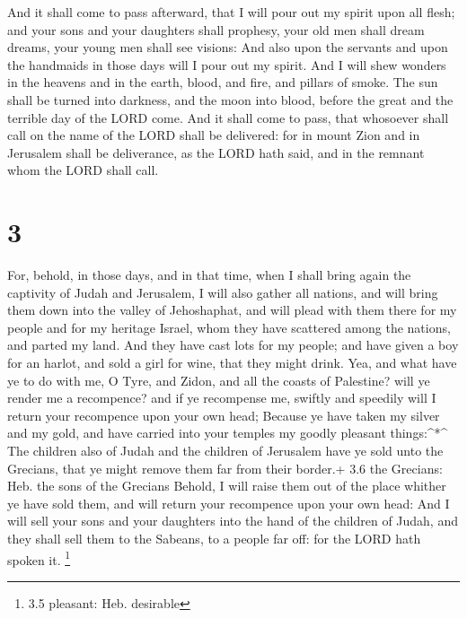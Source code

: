 And it shall come to pass afterward, that I will pour out
my spirit upon all flesh; and your sons and your daughters shall
prophesy, your old men shall dream dreams, your young men shall see
visions:  And also upon the servants and upon the handmaids
in those days will I pour out my spirit.  And I will shew
wonders in the heavens and in the earth, blood, and fire, and pillars of
smoke.  The sun shall be turned into darkness, and the moon
into blood, before the great and the terrible day of the LORD come.
 And it shall come to pass, that whosoever shall call on
the name of the LORD shall be delivered: for in mount Zion and in
Jerusalem shall be deliverance, as the LORD hath said, and in the
remnant whom the LORD shall call.

\hypertarget{section-2}{%
\section{3}\label{section-2}}

 For, behold, in those days, and in that time, when I shall
bring again the captivity of Judah and Jerusalem,  I will
also gather all nations, and will bring them down into the valley of
Jehoshaphat, and will plead with them there for my people and for my
heritage Israel, whom they have scattered among the nations, and parted
my land.  And they have cast lots for my people; and have
given a boy for an harlot, and sold a girl for wine, that they might
drink.  Yea, and what have ye to do with me, O Tyre, and
Zidon, and all the coasts of Palestine? will ye render me a recompence?
and if ye recompense me, swiftly and speedily will I return your
recompence upon your own head;  Because ye have taken my
silver and my gold, and have carried into your temples my goodly
pleasant things:\^{}*\^{}  The children also of Judah and
the children of Jerusalem have ye sold unto the Grecians, that ye might
remove them far from their border.+ 3.6 the Grecians: Heb. the sons of
the Grecians  Behold, I will raise them out of the place
whither ye have sold them, and will return your recompence upon your own
head:  And I will sell your sons and your daughters into the
hand of the children of Judah, and they shall sell them to the Sabeans,
to a people far off: for the LORD hath spoken it. \footnote{3.5
  pleasant: Heb. desirable}

